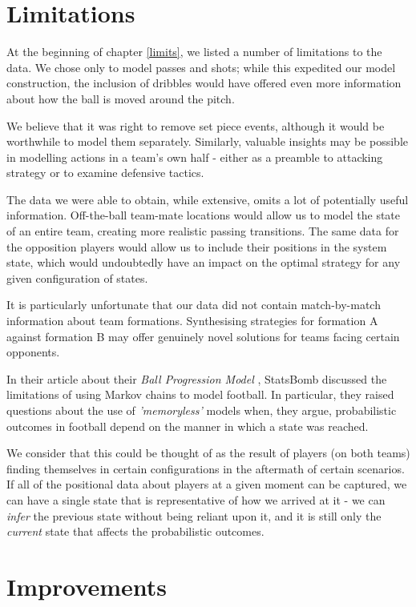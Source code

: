 \documentclass{l4proj}
\begin{document}
\section{Limitations}

At the beginning of chapter \ref{limits}, we listed a number of limitations to the data. We chose only to model passes and shots; while this expedited our model construction, the inclusion of dribbles would have offered even more information about how the ball is moved around the pitch. 

We believe that it was right to remove set piece events, although it would be worthwhile to model them separately. Similarly, valuable insights may be possible in modelling actions in a team's own half - either as a preamble to attacking strategy or to examine defensive tactics.

The data we were able to obtain, while extensive, omits a lot of potentially useful information. Off-the-ball team-mate locations would allow us to model the state of an entire team, creating more realistic passing transitions. The same data for the opposition players would allow us to include their positions in the system state, which would undoubtedly have an impact on the optimal strategy for any given configuration of states.

It is particularly unfortunate that our data did not contain match-by-match information about team formations. Synthesising strategies for formation A against formation B may offer genuinely novel solutions for teams facing certain opponents.

In their article about their \textit{Ball Progression Model} \cite{sbomb2}, StatsBomb discussed the limitations of using Markov chains to model football. In particular, they raised questions about the use of \textit{'memoryless'} models when, they argue, probabilistic outcomes in football depend on the manner in which a state was reached. 

We consider that this could be thought of as the result of players (on both teams) finding themselves in certain configurations in the aftermath of certain scenarios. If all of the positional data about players at a given moment can be captured, we can have a single state that is representative of how we arrived at it - we can \textit{infer} the previous state without being reliant upon it, and it is still only the \textit{current} state that affects the probabilistic outcomes.

\section{Improvements}
\end{document}
